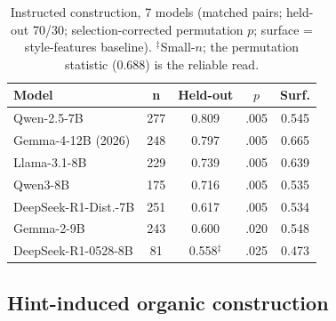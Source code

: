 \documentclass[11pt]{article}
\begin{document}
\begin{table}[t]
\centering
\small
\setlength{\tabcolsep}{4pt}
\begin{tabular}{@{}lcccc@{}}
\toprule
\textbf{Model} & \textbf{n} & \textbf{Held-out} & \textbf{$p$} & \textbf{Surf.} \\
\midrule
Qwen-2.5-7B & 277 & 0.809 & .005 & 0.545 \\
Gemma-4-12B (2026) & 248 & 0.797 & .005 & 0.665 \\
Llama-3.1-8B & 229 & 0.739 & .005 & 0.639 \\
Qwen3-8B & 175 & 0.716 & .005 & 0.535 \\
DeepSeek-R1-Dist.-7B & 251 & 0.617 & .005 & 0.534 \\
Gemma-2-9B & 243 & 0.600 & .020 & 0.548 \\
DeepSeek-R1-0528-8B & 81 & 0.558$^{\ddagger}$ & .025 & 0.473 \\
\bottomrule
\end{tabular}
\caption{Instructed construction, 7 models (matched pairs; held-out 70/30; selection-corrected permutation $p$; surface = style-features baseline). $^{\ddagger}$Small-$n$; the permutation statistic (0.688) is the reliable read.}
\label{tab:synth}
\end{table}

\subsection{Hint-induced organic construction}
\label{sec:hint}
\end{document}
